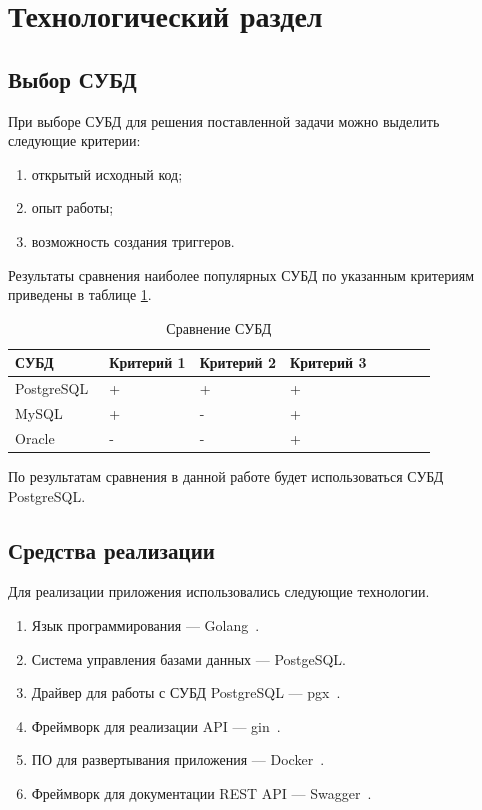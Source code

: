 \section{Технологический раздел}

\subsection{Выбор СУБД}

При выборе СУБД для решения поставленной задачи можно выделить следующие критерии:

\begin{enumerate}[left=0.49cm, label*=---]
	\item открытый исходный код;
	\item опыт работы;
        \item возможность создания триггеров.
\end{enumerate}

Результаты сравнения наиболее популярных СУБД по указанным критериям приведены в таблице \ref{tab:dsms}.

\begin{table}[hbtp]
	\begin{center}
			\caption{\label{tab:dsms}Сравнение СУБД}
		\begin{tabular}{|l|l|l|l|l|l|l|l|}
			\hline {СУБД} & {Критерий 1} & {Критерий 2} & {Критерий 3}\\ \hline
			 PostgreSQL~\cite{postgres} & + & + & + \\ \hline
            MySQL~\cite{mysql} & + & - & + \\ \hline
            Oracle~\cite{oracle} & - & - & + \\ \hline
		\end{tabular}
	\end{center}
\end{table}

По результатам сравнения в данной работе будет использоваться СУБД PostgreSQL.



\subsection{Средства реализации}
Для реализации приложения использовались следующие технологии.

\begin{enumerate}[left=0.49cm, label=\arabic*.]
	\item Язык программирования --- Golang~\cite{golang}.
        \item Система управления базами данных --- PostgeSQL.
	\item Драйвер для работы с СУБД PostgreSQL --- pgx~\cite{pgx}.
        \item Фреймворк для реализации API --- gin~\cite{gin}.
        \item ПО для развертывания приложения --- Docker~\cite{docker}.
        \item Фреймворк для документации REST API --- Swagger~\cite{swagger}.
\end{enumerate}


